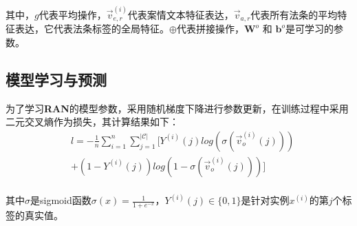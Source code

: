 其中，$g$代表平均操作，$\vec{v}_{e,r}^{(i)}$代表案情文本特征表达，$\vec{v}_{a,r}$代表所有法条的平均特征表达，它代表法条标签的全局特征。$\oplus$代表拼接操作，$\textbf{W}^{o}$ 和 $\textbf{b}^{o}$是可学习的参数。

\subsection{模型学习与预测}
为了学习\textbf{RAN}的模型参数，采用随机梯度下降进行参数更新，在训练过程中采用二元交叉熵作为损失，其计算结果如下：
\begin{equation}\label{eq:loss}
    \begin{aligned}
        & l = -\frac{1}{n}\sum\limits_{i=1}^{n}\sum\limits_{j=1}^{|\mathcal{C}|}[Y^{(i)}(j)log(\sigma(\vec{v}^{(i)}_{o}(j))) \\
        & + (1 - Y^{(i)}(j))log(1 - \sigma(\vec{v}^{(i)}_{o}(j)))] \\
    \end{aligned}
\end{equation}

其中$\sigma$是sigmoid函数$\sigma(x)=\frac{1}{1 + e^{-x}}$，$Y^{(i)}(j) \in \{0, 1\}$是针对实例$x^{(i)}$的第$j$个标签的真实值。

